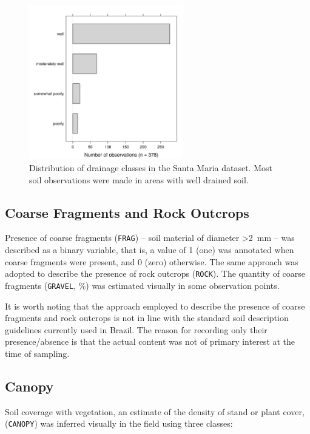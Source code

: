 \begin{figure}[!ht]
\centering
\includegraphics[width=0.60\textwidth]{fig/chap04-drain}
\caption[Distribution of drainage classes in the Santa Maria dataset.]{Distribution of drainage classes in the 
Santa Maria dataset. Most soil observations were made in areas with well drained soil.}
\label{fig:chap04-drain}
\end{figure}

\subsection{Coarse Fragments and Rock Outcrops}

Presence of coarse fragments (\texttt{FRAG}) -- soil material of diameter \SI{>2}{\milli\metre} -- was 
described as a binary variable, that is, a value of \num{1} (one) was annotated when coarse fragments were 
present, and \num{0} (zero) otherwise. The same approach was adopted to describe the presence of rock outcrops 
(\texttt{ROCK}). The quantity of coarse fragments (\texttt{GRAVEL}, \si{\percent}) was estimated visually in 
some observation points.

It is worth noting that the approach employed to describe the presence of coarse fragments and rock outcrops 
is not in line with the standard soil description guidelines currently used in Brazil. The reason for 
recording only their presence/absence is that the actual content was not of primary interest at the time of 
sampling.

\subsection{Canopy}

Soil coverage with vegetation, an estimate of the density of stand or plant cover, (\texttt{CANOPY}) was 
inferred visually in the field using three classes:

